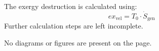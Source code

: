 The exergy destruction is calculated using:  
\[
ex_{\text{vel}} = T_0 \cdot \dot{S}_{\text{gen}}
\]  
Further calculation steps are left incomplete.  

No diagrams or figures are present on the page.